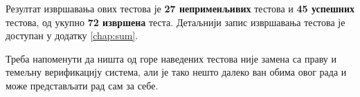 Резултат извршавања ових тестова је \textbf{27 неприменљивих} тестова и \textbf{45 успешних} тестова, од укупно \textbf{72 извршена} теста.
Детаљнији запис извршавања тестова је доступан у  додатку \ref{chap:sum}.

Треба напоменути да ништа од горе наведених тестова није замена са праву и темељну верификацију система, али је тако нешто далеко ван обима овог рада и може представљати рад сам за себе.

